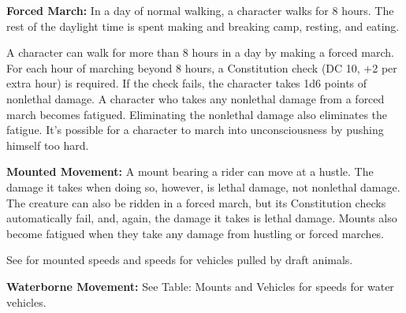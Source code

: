 \textbf{Forced March:} In a day of normal walking, a character walks for 8 hours. The rest of the daylight time is spent making and breaking camp, resting, and eating.

A character can walk for more than 8 hours in a day by making a forced march. For each hour of marching beyond 8 hours, a Constitution check (DC 10, +2 per extra hour) is required. If the check fails, the character takes 1d6 points of nonlethal damage. A character who takes any nonlethal damage from a forced march becomes fatigued. Eliminating the nonlethal damage also eliminates the fatigue. It's possible for a character to march into unconsciousness by pushing himself too hard.

\textbf{Mounted Movement:} A mount bearing a rider can move at a hustle. The damage it takes when doing so, however, is lethal damage, not nonlethal damage. The creature can also be ridden in a forced march, but its Constitution checks automatically fail, and, again, the damage it takes is lethal damage. Mounts also become fatigued when they take any damage from hustling or forced marches.

See  for mounted speeds and speeds for vehicles pulled by draft animals.

\textbf{Waterborne Movement:} See Table: Mounts and Vehicles for speeds for water vehicles.



